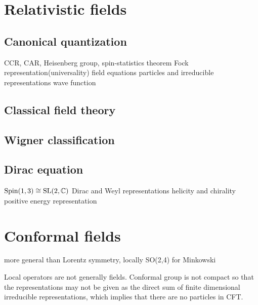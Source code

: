 \documentclass{../../large}
\begin{document}
\chapter{Relativistic fields}
\section{Canonical quantization}
CCR, CAR, Heisenberg group, spin-statistics theorem
Fock representation(universality)
field equations
particles and irreducible representations
wave function
\section{Classical field theory}
\section{Wigner classification}
\section{Dirac equation}
$\mathrm{Spin}(1,3)\cong\mathrm{SL}(2,\mathbb{C})$
Dirac and Weyl representations
helicity and chirality
positive energy representation







\chapter{Conformal fields}
more general than Lorentz symmetry, locally SO(2,4) for Minkowski

Local operators are not generally fields.
Conformal group is not compact so that the representations may not be given as the direct sum of finite dimensional irreducible representations, which implies that there are no particles in CFT.





\section{}
\end{document}
